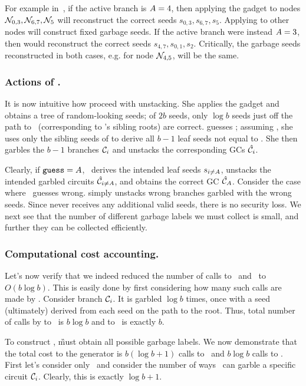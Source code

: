 For example in~, if the active branch is $A=4$,
then applying the gadget to nodes $\mathtt{\cal N}_{0,3}, \mathtt{\cal N}_{6,7},
\mathtt{\cal N}_{5}$ will reconstruct the correct seeds $s_{0,3}, s_{6,7}, s_{5}$.  Applying \gadget to other nodes
will construct fixed garbage seeds.
If the active branch were instead $A=3$, then \gadget
would reconstruct the correct seeds $s_{4,7}, s_{0,1}, s_{2}$.
Critically, the
garbage seeds reconstructed
in both cases, e.g. for node $\mathtt{\cal N}_{4,5}$, will be the same.


\subsubsection{Actions of \E.}

It is now intuitive how \E proceed with unstacking. 
She applies
the gadget \gadget and obtains a tree of random-looking seeds; of $2b$
seeds, only $\log b$ seeds just off the path to \aid\ (corresponding
to \aid's sibling roots) are correct.  \E guesses \guess; assuming
\guess, she uses only the sibling seeds of \guess to derive all
$b-1$ leaf seeds not equal to \guess.  She then garbles the $b-1$
branches $\mathcal C_i$ and unstacks the corresponding GCs $\hat{\mathcal C}_i$.

Clearly, if $\mathtt{guess}=A$, \E\ derives the intended leaf seeds
$s_{i\neq A}$, unstacks the intended garbled circuits
$\hat{\mathcal C}_{i\neq A}$, and obtains the correct GC $\hat{\mathcal C}_{A}$.
%
Consider the case where \E\ guesses wrong. %
\E simply unstacks wrong branches garbled with the wrong seeds.
Since \E never receives any additional valid seeds,
there is no security loss.  We next see that the number of different
garbage labels we must collect is small, and further they can be
collected efficiently.

\subsubsection{Computational cost accounting.} Let's now verify that
we indeed reduced the number of calls to \Gb\ and \Ev\ to $O(b \log
b)$.  This is easily done by first considering how many such calls are
made by \E.  Consider branch $\mathcal C_i$.  It is garbled $\log b$ times,
once with a seed (ultimately) derived from each seed on the path to
the root.  Thus, total number of calls by \E to \Gb\ is $b \log b$ and
to \Ev\ is exactly $b$.  

To construct \gadget, \G must obtain all possible garbage labels.  We
now demonstrate that the total cost to the generator is $b (\log b +
1)$ calls to \Gb\ and $b \log b$ calls to \Ev.
First let’s consider only \Gb\ and consider the number of ways \E\ can garble a specific circuit $\mathcal C_i$. Clearly, this is exactly $\log b+1$.

